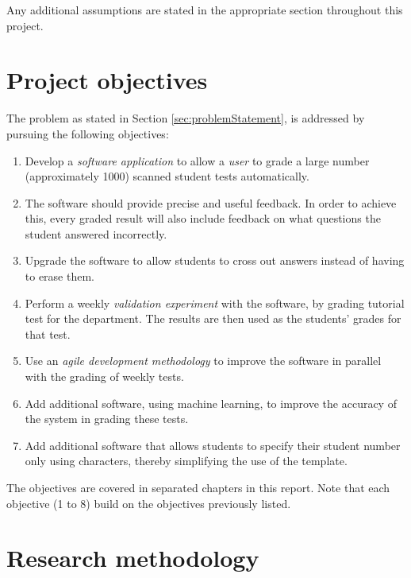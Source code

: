 Any additional assumptions are stated in the appropriate section throughout this project.


\section{Project objectives}
\label{sec:Objectives}

The problem as stated in Section \ref{sec:problemStatement}, is addressed by pursuing the following objectives:
\begin{enumerate}
  \item Develop a \textsl{software application} to allow a \textsl{user} to grade a large number (approximately 1000) scanned student tests automatically.
\item The software should provide precise and useful feedback. In order to achieve this, every graded result will also include feedback on what questions the student answered incorrectly.
\item Upgrade the software to allow students to cross out answers instead of having to erase them.
  \item Perform a weekly \textsl{validation experiment} with the software, by grading tutorial test for the department. The results are then used as the students' grades for that test.
  \item Use an \textsl{agile development methodology} to improve the software in parallel with the grading of weekly tests.
  \item Add additional software, using machine learning, to improve the accuracy of the system in grading these tests.
  \item Add additional software that allows students to specify their student number only using characters, thereby simplifying the use of the template.
\end{enumerate}
The objectives are covered in separated chapters in this report. Note that each objective (1 to 8) build on the objectives previously listed.

\section{Research methodology}

